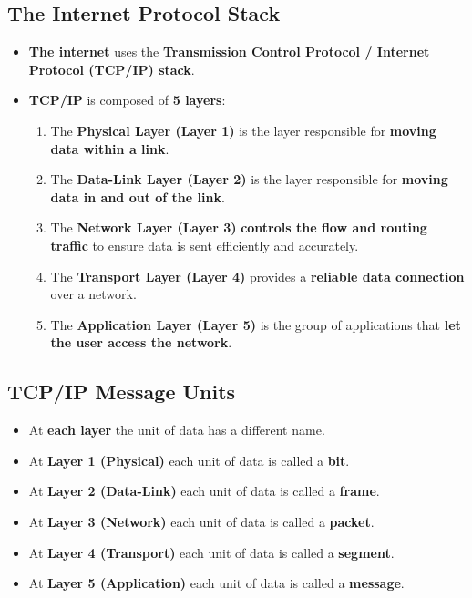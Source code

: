 \documentclass[16pt]{article}
\begin{document}
   \subsection*{The Internet Protocol Stack}
   \begin{itemize}
       \item \textbf{The internet} uses the \textbf{Transmission Control Protocol / Internet Protocol (TCP/IP) stack}.
       \item \textbf{TCP/IP} is composed of \textbf{5 layers}:
       \begin{enumerate}
           \item The \textbf{Physical Layer (Layer 1)} is the layer responsible for \textbf{moving data within a link}.
           \item The \textbf{Data-Link Layer (Layer 2)} is the layer responsible for \textbf{moving data in and out of the link}.
           \item The \textbf{Network Layer (Layer 3)} \textbf{controls the flow and routing traffic} to ensure data is sent efficiently and accurately.
           \item The \textbf{Transport Layer (Layer 4)} provides a \textbf{reliable data connection} over a network.
           \item The \textbf{Application Layer (Layer 5)} is the group of applications that \textbf{let the user access the network}.
       \end{enumerate}
   \end{itemize}

   \subsection*{TCP/IP Message Units}
   \begin{itemize}
       \item At \textbf{each layer} the unit of data has a different name.
       \item At \textbf{Layer 1 (Physical)} each unit of data is called a \textbf{bit}.
       \item At \textbf{Layer 2 (Data-Link)} each unit of data is called a \textbf{frame}.
       \item At \textbf{Layer 3 (Network)} each unit of data is called a \textbf{packet}.
       \item At \textbf{Layer 4 (Transport)} each unit of data is called a \textbf{segment}.
       \item At \textbf{Layer 5 (Application)} each unit of data is called a \textbf{message}.
   \end{itemize}
\end{document}
